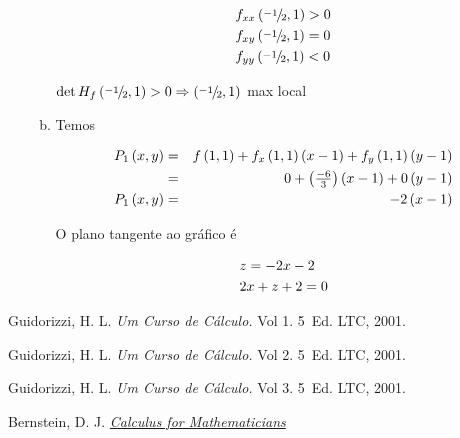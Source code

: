 \documentclass[11pt, oneside, a4paper]{gsm-l}
\begin{document}
\begin{enumerate}
\begin{sol}
\begin{enumerate}[(a)]
\[
\begin{gathered}
  f_{xx} \left( {{\raise0.5ex\hbox{$\scriptstyle { - 1}$}
\kern-0.1em/\kern-0.15em
\lower0.25ex\hbox{$\scriptstyle 2$}},1} \right) > 0 \hfill \\
  f_{xy} \left( {{\raise0.5ex\hbox{$\scriptstyle { - 1}$}
\kern-0.1em/\kern-0.15em
\lower0.25ex\hbox{$\scriptstyle 2$}},1} \right) = 0 \hfill \\
  f_{yy} \left( {{\raise0.5ex\hbox{$\scriptstyle { - 1}$}
\kern-0.1em/\kern-0.15em
\lower0.25ex\hbox{$\scriptstyle 2$}},1} \right) < 0 \hfill \\
\end{gathered}
\]

$\det H_f \left( {{\raise0.5ex\hbox{$\scriptstyle { - 1}$}
\kern-0.1em/\kern-0.15em
\lower0.25ex\hbox{$\scriptstyle 2$}},1} \right) > 0 \Rightarrow \left( {{\raise0.5ex\hbox{$\scriptstyle { - 1}$}
\kern-0.1em/\kern-0.15em
\lower0.25ex\hbox{$\scriptstyle 2$}},1} \right)$ max local

\newpage 

    \item Temos

\begin{eqnarray*}
  P_1 \left( {x,y} \right) &=& f\left( {1,1} \right) + f_x \left( {1,1} \right)\left( {x - 1} \right) + f_y \left( {1,1} \right)\left( {y - 1} \right) \hfill \\
   &=& 0 + \left( {\tfrac{{ - 6}}{3}} \right)\left( {x - 1} \right) + 0\left( {y - 1} \right) \hfill \\
  P_1 \left( {x,y} \right) &=&  - 2\left( {x - 1} \right) \hfill \\
\end{eqnarray*}

O plano tangente ao gráfico é

\[
\begin{gathered}
  z =  - 2x - 2 \hfill \\
  2x + z + 2 = 0 \hfill \\
\end{gathered}
\]


  \end{enumerate}
\end{sol}

\end{enumerate}


\begin{thebibliography}{99}

 Guidorizzi, H. L. {\sl Um Curso de Cálculo.} Vol 1. 5\textordfeminine\ Ed. LTC, 2001.

 Guidorizzi, H. L. {\sl Um Curso de Cálculo.} Vol 2. 5\textordfeminine\ Ed. LTC, 2001.

 Guidorizzi, H. L. {\sl Um Curso de Cálculo.} Vol 3. 5\textordfeminine\ Ed. LTC, 2001.

 Bernstein, D. J. \href{http://cr.yp.to/papers/calculus.pdf}{{\sl Calculus for Mathematicians}}

\end{thebibliography}

\printindex
\end{document}
